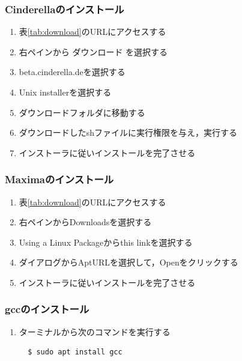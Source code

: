 \newpage

\subsubsection{Cinderellaのインストール}
\begin{enumerate}
    \item 表\ref{tab:download}のURLにアクセスする
    \item 右ペインから ダウンロード を選択する
    \item beta.cinderella.deを選択する
    \item Unix installerを選択する
    \item ダウンロードフォルダに移動する
    \item ダウンロードしたshファイルに実行権限を与え，実行する
    \item インストーラに従いインストールを完了させる
\end{enumerate}

\subsubsection{Maximaのインストール}
\begin{enumerate}
    \item 表\ref{tab:download}のURLにアクセスする
    \item 右ペインからDownloadsを選択する
    \item Using a Linux Packageからthis linkを選択する
    \item ダイアログからAptURLを選択して，Openをクリックする
    \item インストーラに従いインストールを完了させる
\end{enumerate}

\subsubsection{gccのインストール}
\begin{enumerate}
    \item ターミナルから次のコマンドを実行する
    \begin{lstlisting}
  $ sudo apt install gcc
    \end{lstlisting}
\end{enumerate}